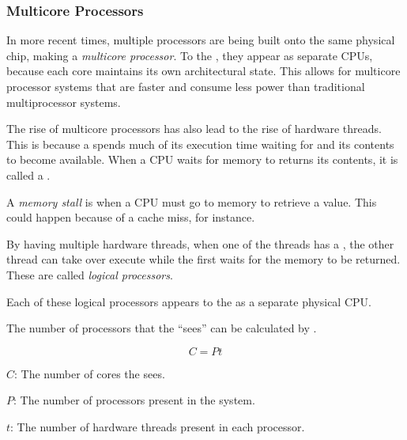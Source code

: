 \subsubsection{Multicore Processors}\label{subsubsec:Multicore_Processors}
In more recent times, multiple processors are being built onto the same physical chip, making a \emph{multicore processor}.
To the , they appear as separate CPUs, because each core maintains its own architectural state.
This allows for multicore processor systems that are faster and consume less power than traditional multiprocessor systems.

The rise of multicore processors has also lead to the rise of hardware threads.
This is because a  spends much of its execution time waiting for  and its contents to become available.
When a CPU waits for memory to returns its contents, it is called a .

\begin{definition}\label{def:Memory_Stall}
  A \emph{memory stall} is when a CPU must go to memory to retrieve a value.
  This could happen because of a cache miss, for instance.
\end{definition}

By having multiple hardware threads, when one of the threads has a , the other thread can take over execute while the first waits for the memory to be returned.
These are called \emph{logical processors}.

\begin{blackbox}
  Each of these logical processors appears to the  as a separate physical CPU.\@
\end{blackbox}

The number of processors that the  ``sees'' can be calculated by .

\begin{equation}\label{eq:Num_Cores}
  C = Pt
\end{equation}
\begin{description}[noitemsep]
\item $C$: The number of cores the  sees.
\item $P$: The number of processors present in the system.
\item $t$: The number of hardware threads present in each processor.
\end{description}

